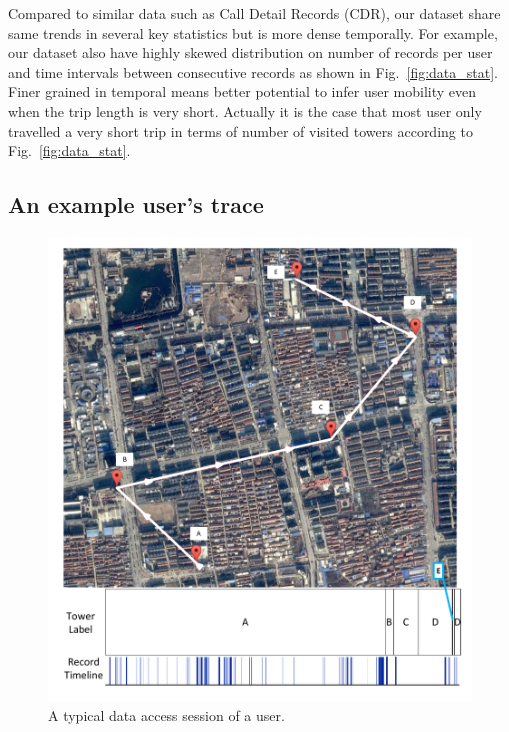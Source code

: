 Compared to similar data such as Call Detail Records (CDR), our dataset share same trends in several key statistics but is more dense temporally. For example, our dataset also have highly skewed distribution on number of records per user and time intervals between consecutive records as shown in Fig.~\ref{fig:data_stat}. Finer grained in temporal means better potential to infer user mobility even when the trip length is very short. Actually it is the case that most user only travelled a very short trip in terms of number of visited towers according to Fig.~\ref{fig:data_stat}.

\subsection{An example user's trace}

\begin{figure}[h]
    \centering
    \includegraphics[width=\linewidth]{./figures/typical_user.pdf}
    \caption{A typical data access session of a user.}
    \label{fig:typical_user}
\end{figure}

